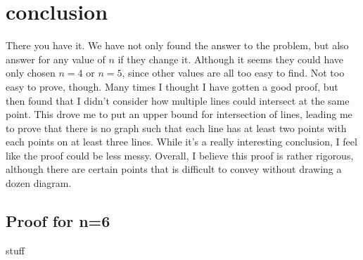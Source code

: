 \documentclass[a4paper, 12pt]{article}
\begin{document}
\clearpage
\section{conclusion}
There you have it. We have not only found the answer to the problem, but also answer for any value of $n$ if they change it. Although it seems they could have only chosen $n=4$ or $n=5$, since other values are all too easy to find. Not too easy to prove, though. Many times I thought I have gotten a good proof, but then found that I didn't consider how multiple lines could intersect at the same point. This drove me to put an upper bound for intersection of lines, leading me to prove that there is no graph such that each line has at least two points with each points on at least three lines. While it's a really interesting conclusion, I feel like the proof could be less messy. 
Overall, I believe this proof is rather rigorous, although there are certain points that is difficult to convey without drawing a dozen diagram.


\clearpage
\begin{appendices}

\section{Proof for n=6}
\label{appendix:proof_n6}
stuff


\end{appendices}
\end{document}
